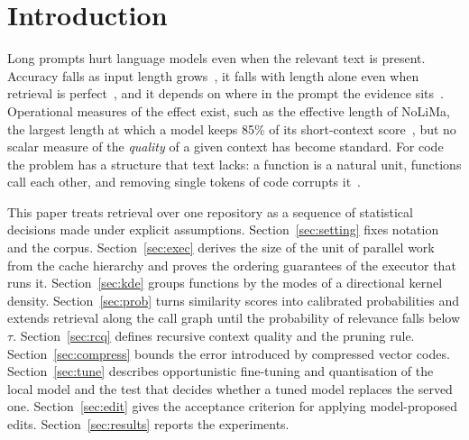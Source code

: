 \documentclass[10pt,twocolumn]{article}
\theoremstyle{definition}
\theoremstyle{remark}
\begin{document}
\section{Introduction}

Long prompts hurt language models even when the relevant text is present.
Accuracy falls as input length grows~\cite{hong2025contextrot}, it falls with length alone even when retrieval is perfect~\cite{du2025length}, and it depends on where in the prompt the evidence sits~\cite{liu2024lost}.
Operational measures of the effect exist, such as the effective length of NoLiMa, the largest length at which a model keeps 85\% of its short-context score~\cite{modarressi2025nolima}, but no scalar measure of the \emph{quality} of a given context has become standard.
For code the problem has a structure that text lacks: a function is a natural unit, functions call each other, and removing single tokens of code corrupts it~\cite{shi2025longcodezip,zhang2025cast}.

This paper treats retrieval over one repository as a sequence of statistical decisions made under explicit assumptions.
Section~\ref{sec:setting} fixes notation and the corpus.
Section~\ref{sec:exec} derives the size of the unit of parallel work from the cache hierarchy and proves the ordering guarantees of the executor that runs it.
Section~\ref{sec:kde} groups functions by the modes of a directional kernel density.
Section~\ref{sec:prob} turns similarity scores into calibrated probabilities and extends retrieval along the call graph until the probability of relevance falls below $\tau$.
Section~\ref{sec:rcq} defines recursive context quality and the pruning rule.
Section~\ref{sec:compress} bounds the error introduced by compressed vector codes.
Section~\ref{sec:tune} describes opportunistic fine-tuning and quantisation of the local model and the test that decides whether a tuned model replaces the served one.
Section~\ref{sec:edit} gives the acceptance criterion for applying model-proposed edits.
Section~\ref{sec:results} reports the experiments.
\end{document}
